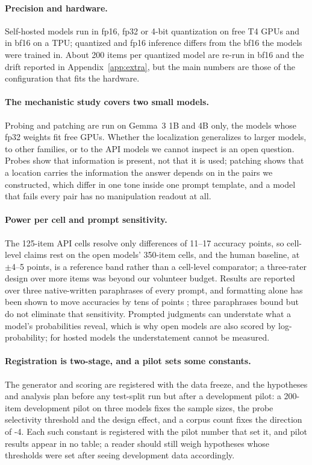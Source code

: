 \paragraph{Precision and hardware.}
Self-hosted models run in fp16, fp32 or 4-bit quantization on free T4 GPUs and in bf16 on a TPU; quantized and fp16 inference differs from the bf16 the models were trained in. About 200 items per quantized model are re-run in bf16 and the drift reported in Appendix~\ref{app:extra}, but the main numbers are those of the configuration that fits the hardware.

\paragraph{The mechanistic study covers two small models.}
Probing and patching are run on Gemma~3 1B and 4B only, the models whose fp32 weights fit free GPUs. Whether the localization generalizes to larger models, to other families, or to the API models we cannot inspect is an open question. Probes show that information is present, not that it is used; patching shows that a location carries the information the answer depends on in the pairs we constructed, which differ in one tone inside one prompt template, and a model that fails every pair has no manipulation readout at all.

\paragraph{Power per cell and prompt sensitivity.}
The 125-item API cells resolve only differences of 11--17 accuracy points, so cell-level claims rest on the open models' 350-item cells, and the human baseline, at $\pm$4--5 points, is a reference band rather than a cell-level comparator; a three-rater design over more items was beyond our volunteer budget. Results are reported over three native-written paraphrases of every prompt, and formatting alone has been shown to move accuracies by tens of points \citep{2310.11324}; three paraphrases bound but do not eliminate that sensitivity. Prompted judgments can understate what a model's probabilities reveal, which is why open models are also scored by log-probability; for hosted models the understatement cannot be measured.

\paragraph{Registration is two-stage, and a pilot sets some constants.}
The generator and scoring are registered with the data freeze, and the hypotheses and analysis plan before any test-split run but after a development pilot: a 200-item development pilot on three models fixes the sample sizes, the probe selectivity threshold and the design effect, and a corpus count fixes the direction of \hyp{4}. Each such constant is registered with the pilot number that set it, and pilot results appear in no table; a reader should still weigh hypotheses whose thresholds were set after seeing development data accordingly.


